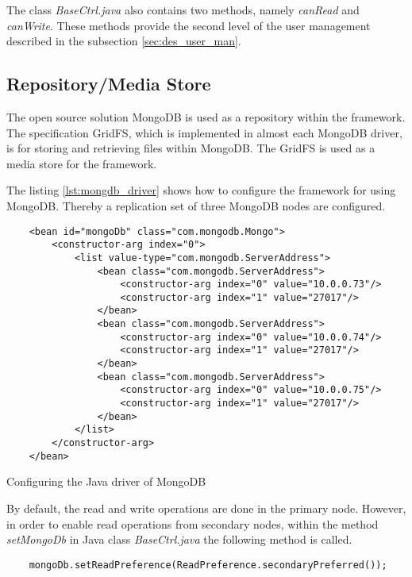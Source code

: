The class \textit{BaseCtrl.java} also contains two methods, namely \textit{canRead} and \textit{canWrite}. These methods provide the second level of the user management described in the subsection \ref{sec:des_user_man}.

\subsection{Repository/Media Store\label{sec:impl_repo}}

The open source solution MongoDB is used as a repository within the framework. The specification GridFS, which is implemented in almost each MongoDB driver, is for storing and retrieving files within MongoDB. The GridFS is used as a media store for the framework.

The listing \ref{lst:mongdb_driver} shows how to configure the framework for using MongoDB. Thereby a replication set of three MongoDB nodes are configured. 

\begin{code}
\begin{verbatim}
    <bean id="mongoDb" class="com.mongodb.Mongo">
        <constructor-arg index="0">
            <list value-type="com.mongodb.ServerAddress">
                <bean class="com.mongodb.ServerAddress">
                    <constructor-arg index="0" value="10.0.0.73"/>
                    <constructor-arg index="1" value="27017"/>
                </bean>
                <bean class="com.mongodb.ServerAddress">
                    <constructor-arg index="0" value="10.0.0.74"/>
                    <constructor-arg index="1" value="27017"/>
                </bean>
                <bean class="com.mongodb.ServerAddress">
                    <constructor-arg index="0" value="10.0.0.75"/>
                    <constructor-arg index="1" value="27017"/>
                </bean>
            </list>
        </constructor-arg>
    </bean>
\end{verbatim}
\caption{Configuring the Java driver of MongoDB}
\label{lst:mongdb_driver}
\end{code}

By default, the read and write operations are done in the primary node. However, in order to enable read operations from secondary nodes, within the method \textit{setMongoDb} in Java class \textit{BaseCtrl.java} the following method is called.

\begin{code}
\begin{verbatim}
	mongoDb.setReadPreference(ReadPreference.secondaryPreferred());
\end{verbatim}
\end{code}

